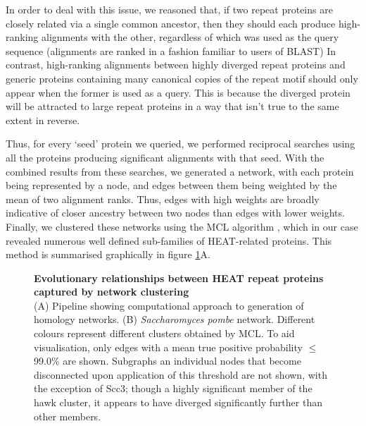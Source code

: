 \documentclass[a4paper,11pt,twoside,openright]{scrbook}
\begin{document}
In order to deal with this issue, we reasoned that, if two repeat proteins are closely related via a single common ancestor, then they should each produce high-ranking alignments with the other, regardless of which was used as the query sequence (alignments are ranked in a fashion familiar to users of BLAST) In contrast, high-ranking alignments between highly diverged repeat proteins and generic proteins containing many canonical copies of the repeat motif should only appear when the former is used as a query. This is because the diverged protein will be attracted to large repeat proteins in a way that isn't true to the same extent in reverse.

Thus, for every `seed' protein we queried, we performed reciprocal searches using all the proteins producing significant alignments with that seed. With the combined results from these searches, we generated a network, with each protein being represented by a node, and edges between them being weighted by the mean of two alignment ranks. Thus, edges with high weights are broadly indicative of closer ancestry between two nodes than edges with lower weights. Finally, we clustered these networks using the MCL algorithm \cite{VanDongen2000}, which in our case revealed numerous well defined sub-families of HEAT-related proteins. This method is summarised graphically in figure \ref{figure:clustering}A.

\begin{figure}[h]
    \caption[Evolutionary relationships between HEAT repeat proteins captured by network clustering]{\sffamily \textbf{Evolutionary relationships between HEAT repeat proteins captured by network clustering} \\ \small (A) Pipeline showing computational approach to generation of homology networks. (B) \textit{Saccharomyces pombe} network. Different colours represent different clusters obtained by MCL. To aid visualisation, only edges with a mean true positive probability $\leq$ 99.0\% are shown. Subgraphs an individual nodes that become disconnected upon application of this threshold are not shown, with the exception of Scc3; though a highly significant member of the hawk cluster, it appears to have diverged significantly further than other members.}
    \label{figure:clustering}
\end{figure}
\end{document}
